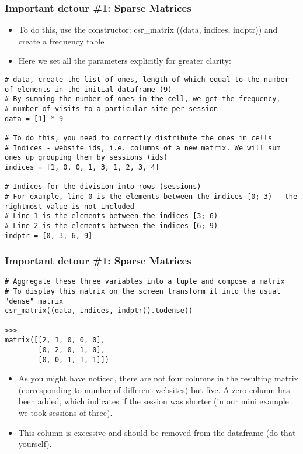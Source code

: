 \begin{frame}[fragile]\frametitle{Important detour \#1: Sparse Matrices}	
\begin{itemize}
\item To do this, use the constructor: csr\_matrix ((data, indices, indptr)) and create a frequency table 
\item Here we set all the parameters explicitly for greater clarity:
\end{itemize}

\begin{lstlisting}
# data, create the list of ones, length of which equal to the number of elements in the initial dataframe (9)
# By summing the number of ones in the cell, we get the frequency,
# number of visits to a particular site per session
data = [1] * 9

# To do this, you need to correctly distribute the ones in cells
# Indices - website ids, i.e. columns of a new matrix. We will sum ones up grouping them by sessions (ids)
indices = [1, 0, 0, 1, 3, 1, 2, 3, 4]

# Indices for the division into rows (sessions)
# For example, line 0 is the elements between the indices [0; 3) - the rightmost value is not included
# Line 1 is the elements between the indices [3; 6)
# Line 2 is the elements between the indices [6; 9) 
indptr = [0, 3, 6, 9]
\end{lstlisting}

\end{frame}


\begin{frame}[fragile]\frametitle{Important detour \#1: Sparse Matrices}	
\begin{lstlisting}
# Aggregate these three variables into a tuple and compose a matrix
# To display this matrix on the screen transform it into the usual "dense" matrix
csr_matrix((data, indices, indptr)).todense()

>>>
matrix([[2, 1, 0, 0, 0],
        [0, 2, 0, 1, 0],
        [0, 0, 1, 1, 1]])
\end{lstlisting}

\begin{itemize}
\item As you might have noticed, there are not four columns in the resulting matrix (corresponding to number of different websites) but five. A zero column has been added, which indicates if the session was shorter (in our mini example we took sessions of three). 
\item This column is excessive and should be removed from the dataframe (do that yourself).
\end{itemize}

\end{frame}

